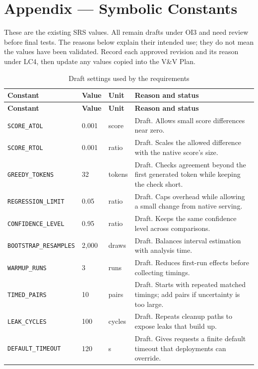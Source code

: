 \documentclass[12pt]{article}
\begin{document}
\section{Appendix --- Symbolic Constants}
\label{sec:symbolic-constants}

These are the existing SRS values. All remain drafts under OI3 and need
review before final tests. The reasons below explain their intended use;
they do not mean the values have been validated. Record each approved
revision and its reason under LC4, then update any values copied into the
V\&V Plan.

\begin{longtable}{@{}p{}p{}p{}p{}@{}}
\caption{Draft settings used by the requirements}\label{tab:symbolic-constants}\\
\toprule \textbf{Constant} & \textbf{Value} & \textbf{Unit} & \textbf{Reason and status}\\
\midrule
\endfirsthead
\toprule \textbf{Constant} & \textbf{Value} & \textbf{Unit} & \textbf{Reason and status}\\
\midrule
\endhead
\texttt{SCORE\_ATOL} & 0.001 & score & Draft. Allows small score differences near zero.\\
\texttt{SCORE\_RTOL} & 0.001 & ratio & Draft. Scales the allowed difference with the native score's size.\\
\texttt{GREEDY\_TOKENS} & 32 & tokens & Draft. Checks agreement beyond the first generated token while keeping the check short.\\
\texttt{REGRESSION\_LIMIT} & 0.05 & ratio & Draft. Caps overhead while allowing a small change from native serving.\\
\texttt{CONFIDENCE\_LEVEL} & 0.95 & ratio & Draft. Keeps the same confidence level across comparisons.\\
\texttt{BOOTSTRAP\_RESAMPLES} & 2,000 & draws & Draft. Balances interval estimation with analysis time.\\
\texttt{WARMUP\_RUNS} & 3 & runs & Draft. Reduces first-run effects before collecting timings.\\
\texttt{TIMED\_PAIRS} & 10 & pairs & Draft. Starts with repeated matched timings; add pairs if uncertainty is too large.\\
\texttt{LEAK\_CYCLES} & 100 & cycles & Draft. Repeats cleanup paths to expose leaks that build up.\\
\texttt{DEFAULT\_TIMEOUT} & 120 & s & Draft. Gives requests a finite default timeout that deployments can override.\\
\bottomrule
\end{longtable}
\end{document}
